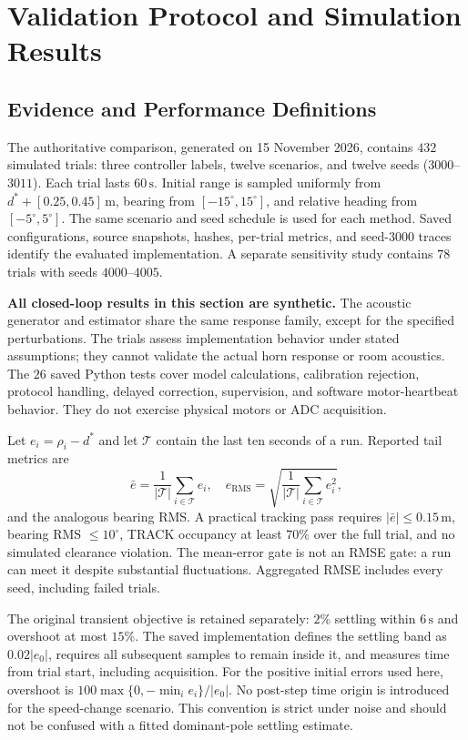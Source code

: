 \section{Validation Protocol and Simulation Results}
\label{sec:valid}
\subsection{Evidence and Performance Definitions}
The authoritative comparison, generated on 15 November 2026, contains $432$ simulated trials: three controller labels, twelve scenarios, and twelve seeds ($3000$--$3011$). Each trial lasts $60\,\mathrm s$. Initial range is sampled uniformly from $d^\ast+[0.25,0.45]\,\mathrm m$, bearing from $[-15^\circ,15^\circ]$, and relative heading from $[-5^\circ,5^\circ]$. The same scenario and seed schedule is used for each method. Saved configurations, source snapshots, hashes, per-trial metrics, and seed-$3000$ traces identify the evaluated implementation. A separate sensitivity study contains $78$ trials with seeds $4000$--$4005$.

\textbf{All closed-loop results in this section are synthetic.} The acoustic generator and estimator share the same response family, except for the specified perturbations. The trials assess implementation behavior under stated assumptions; they cannot validate the actual horn response or room acoustics. The $26$ saved Python tests cover model calculations, calibration rejection, protocol handling, delayed correction, supervision, and software motor-heartbeat behavior. They do not exercise physical motors or ADC acquisition.

Let $e_i=\rho_i-d^\ast$ and let $\mathcal T$ contain the last ten seconds of a run. Reported tail metrics are
\begin{equation}
\bar e=\frac{1}{|\mathcal T|}\sum_{i\in\mathcal T}e_i,\quad
e_{\mathrm{RMS}}=\sqrt{\frac{1}{|\mathcal T|}\sum_{i\in\mathcal T}e_i^2},
\end{equation}
and the analogous bearing RMS. A practical tracking pass requires $|\bar e|\le0.15\,\mathrm m$, bearing RMS $\le10^\circ$, TRACK occupancy at least $70\%$ over the full trial, and no simulated clearance violation. The mean-error gate is not an RMSE gate: a run can meet it despite substantial fluctuations. Aggregated RMSE includes every seed, including failed trials.

The original transient objective is retained separately: $2\%$ settling within $6\,\mathrm s$ and overshoot at most $15\%$. The saved implementation defines the settling band as $0.02|e_0|$, requires all subsequent samples to remain inside it, and measures time from trial start, including acquisition. For the positive initial errors used here, overshoot is $100\max\{0,-\min_i e_i\}/|e_0|$. No post-step time origin is introduced for the speed-change scenario. This convention is strict under noise and should not be confused with a fitted dominant-pole settling estimate.

